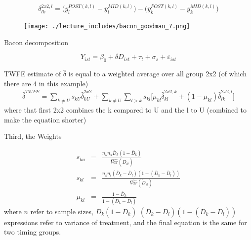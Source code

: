 \documentclass{beamer}
\begin{document}
\begin{frame}[plain]
$$\delta_{lk}^{2x2,l} = \bigg ( \overline{y}_l^{POST(k,l)} - \overline{y}_l^{MID(k,l)} \bigg ) - \bigg ( \overline{y}_k^{POST(k,l)} - \overline{y}_k^{MID(k,l)} \bigg ) $$

	\begin{figure}
	\texttt{[image: ./lecture\_includes/bacon\_goodman\_7.png]}
	\end{figure}

\end{frame}


	

\begin{frame}{Bacon decomposition}

$$Y_{ist} = \beta_0 + \delta D_{ist} + \tau_t + \sigma_s + \varepsilon_{ist}$$


TWFE estimate of $\widehat{\delta}$ is equal to a weighted average over all group 2x2 (of which there are 4 in this example)
\begin{eqnarray*}	
\widehat{\delta}^{TWFE} = \sum_{k \neq U} s_{kU}\widehat{\delta}_{kU}^{2x2} + \sum_{k \neq U} \sum_{l>k} s_{kl}  \bigg [ \mu_{kl}\widehat{\delta}_{kl}^{2x2,k} + (1-\mu_{kl}) \widehat{\delta}_{lk}^{2x2,l} \bigg]
\end{eqnarray*}where that first 2x2 combines the k compared to U and the l to U (combined to make the equation shorter)

\end{frame}
	


\begin{frame}{Third, the Weights}

 \begin{eqnarray*} s_{ku} &=& \frac{ n_k n_u \overline{D}_k (1- \overline{D}_k ) }{ \widehat{Var} ( \tilde{D}_{it} )} \\
s_{kl} &=& \frac{ n_k n_l (\overline{D}_k - \overline{D}_{l} ) ( 1- ( \overline{D}_k - \overline{D}_{l} )) }{\widehat{Var}(\tilde{D}_{it})} \\
\mu_{kl} &=& \frac{1 - \overline{D}_k }{1 - ( \overline{D}_k - \overline{D}_{l} )}
\end{eqnarray*}where $n$ refer to sample sizes, $\overline{D}_k (1- \overline{D}_k )$ $(\overline{D}_k - \overline{D}_{l} ) ( 1- ( \overline{D}_k - \overline{D}_{l} ))$ expressions refer to variance of treatment, and the final equation is the same for two timing groups.

\end{frame}
\end{document}
